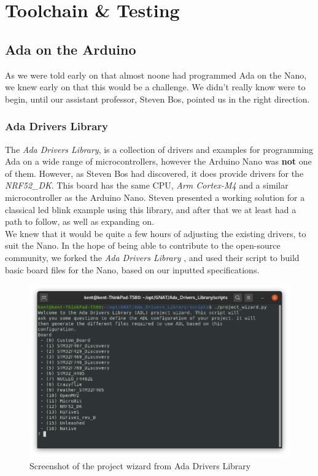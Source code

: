 \documentclass{article}
\begin{document}
\section{Toolchain \& Testing}
\subsection{Ada on the Arduino}
As we were told early on that almost noone had programmed Ada on the Nano, we knew early on that this would be a challenge. We didn't really know were to begin, until our assistant professor, Steven Bos, pointed us in the right direction. 

\subsubsection{Ada Drivers Library}

The \textit{Ada Drivers Library}, is a collection of drivers and examples for programming Ada on a wide range of microcontrollers, however the Arduino Nano was \textbf{not} one of them. However, as Steven Bos had discovered, it does provide drivers for the \textit{NRF52\_DK}. This board has the same CPU, \textit{Arm Cortex-M4} and a similar microcontroller as the Arduino Nano. Steven presented a working solution for a classical led blink example using this library, and after that we at least had a path to follow, as well as expanding on.\\ 

We knew that it would be quite a few hours of adjusting the existing drivers, to suit the Nano. In the hope of being able to contribute to the open-source community, we forked the \textit{Ada Drivers Library}
, and used their script to build basic board files for the Nano, based on our inputted specifications. 

\begin{figure}[H]
  \centering
  \includegraphics[width=\linewidth]{projectwizard.png}
  \caption{Screenshot of the project wizard from Ada Drivers Library}
  \label{projectWizard}
\end{figure}
\end{document}
